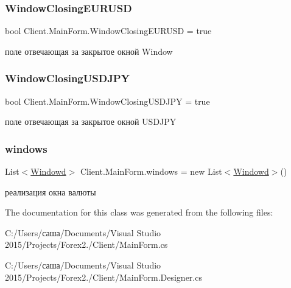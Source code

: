 \subsubsection{\texorpdfstring{Window\+Closing\+E\+U\+R\+U\+SD}{WindowClosingEURUSD}}
{\footnotesize\ttfamily bool Client.\+Main\+Form.\+Window\+Closing\+E\+U\+R\+U\+SD = true\hspace{0.3cm}{\ttfamily [static]}}



поле отвечающая за закрытое окной Window 

\hypertarget{class_client_1_1_main_form_a803bcf3080d58c8bcabb930e01193d09}{}\label{class_client_1_1_main_form_a803bcf3080d58c8bcabb930e01193d09} 
\subsubsection{\texorpdfstring{Window\+Closing\+U\+S\+D\+J\+PY}{WindowClosingUSDJPY}}
{\footnotesize\ttfamily bool Client.\+Main\+Form.\+Window\+Closing\+U\+S\+D\+J\+PY = true\hspace{0.3cm}{\ttfamily [static]}}



поле отвечающая за закрытое окной U\+S\+D\+J\+PY 

\hypertarget{class_client_1_1_main_form_a3e3dca9d63d0282147f521d7f209444f}{}\label{class_client_1_1_main_form_a3e3dca9d63d0282147f521d7f209444f} 
\subsubsection{\texorpdfstring{windows}{windows}}
{\footnotesize\ttfamily List$<$\hyperlink{class_client_1_1_windowd}{Windowd}$>$ Client.\+Main\+Form.\+windows = new List$<$\hyperlink{class_client_1_1_windowd}{Windowd}$>$()}



реализация окна валюты 



The documentation for this class was generated from the following files\+:\begin{DoxyCompactItemize}
\item 
C\+:/\+Users/саша/\+Documents/\+Visual Studio 2015/\+Projects/\+Forex2./\+Client/Main\+Form.\+cs\item 
C\+:/\+Users/саша/\+Documents/\+Visual Studio 2015/\+Projects/\+Forex2./\+Client/Main\+Form.\+Designer.\+cs\end{DoxyCompactItemize}
